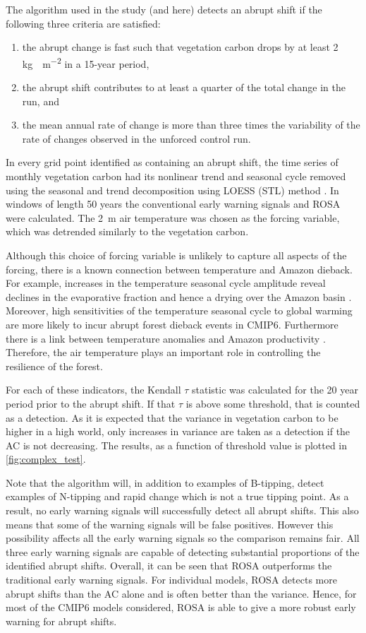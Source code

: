 The algorithm used in the study (and here) detects an abrupt shift if the following three criteria are satisfied:
\begin{enumerate}
\item the abrupt change is fast such that vegetation carbon drops by at least 2 \si{\kilogram\carbon\per\meter\squared} in a 15-year period,
\item the abrupt shift contributes to at least a quarter of the total change in the run, and
\item the mean annual rate of change is more than three times the variability of the rate of changes observed in the unforced control run. 
\end{enumerate}
In every grid point identified as containing an abrupt shift, the time series of monthly vegetation carbon had its nonlinear trend and seasonal cycle removed
using the seasonal and trend decomposition using
LOESS (STL) method \parencite{Cleaveland1990}. In 
windows of length 50 years the conventional early warning signals and ROSA were calculated.
The \si{2\meter} air temperature  was chosen as the forcing variable, which
was detrended similarly to the vegetation carbon. 

Although this choice of forcing variable is unlikely to capture all aspects
of the forcing, there is a known connection between temperature and Amazon 
dieback. For example, increases in the temperature seasonal cycle amplitude reveal declines in the evaporative fraction and hence a drying over the Amazon basin \parencite{Ritchie2022}.
Moreover, high sensitivities of the temperature seasonal cycle to global warming are more likely to incur abrupt forest dieback events \parencite{Parry2022} in CMIP6.
Furthermore there is a link between temperature anomalies and Amazon productivity \parencite{Boulton2013}.
Therefore, the air temperature plays an important role in controlling the resilience of the forest.

For each of these indicators, the Kendall $\tau$ statistic was calculated for the
20 year period prior to the abrupt shift. If that $\tau$ is above some threshold, that is counted 
as a detection. As it is expected that the variance in vegetation carbon to be higher 
in a high  world, only increases in variance are taken as a detection if
the AC is not decreasing. The results, as a function of threshold value
is plotted in \cref{fig:complex_test}.

Note that the algorithm will, in addition to examples of B-tipping, detect examples
of N-tipping and rapid change which is not a true tipping point. As a result, no 
early warning signals will successfully detect all abrupt shifts. This also means that some
of the warning signals will be false positives. However this possibility
affects all the early warning signals so the comparison remains fair. All three early warning signals are capable
of detecting substantial proportions of the identified abrupt shifts. Overall, it can be seen that ROSA outperforms the traditional early warning signals.
For individual models,
ROSA detects more abrupt shifts than the AC alone and is often better than the 
variance. Hence, for most of the CMIP6 models considered, ROSA is able to give a more robust
early warning for abrupt shifts.

